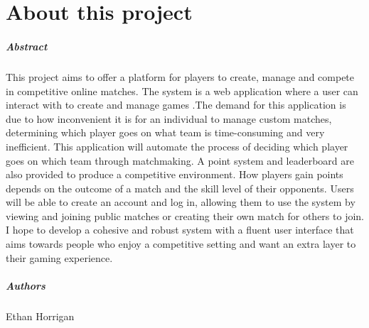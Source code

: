 
\chapter*{About this project}
\paragraph{Abstract}

This project aims to offer a platform for players to create, manage and compete in competitive online matches. The system is a web application where a user can interact with to create and manage games .\newline The demand for this application is due to how inconvenient it is for an individual to manage custom matches, determining which player goes on what team is time-consuming and very inefficient. This application will automate the process of deciding which player goes on which team through matchmaking. A point system and leaderboard are also provided to produce a competitive environment. How players gain points depends on the outcome of a match and the skill level of their opponents. Users will be able to create an account and log in, allowing them to use the system by viewing and joining public matches or creating their own match for others to join. I hope to develop a cohesive and robust system with a fluent user interface that aims towards people who enjoy a competitive setting and want an extra layer to their gaming experience.
\paragraph{Authors}
Ethan Horrigan


